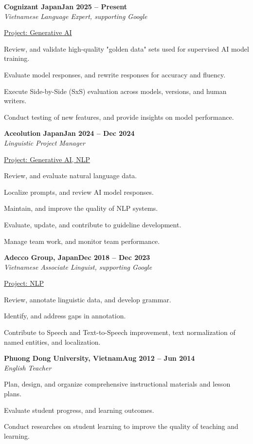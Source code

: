 \documentclass[letterpaper,10pt]{article}
\newcommand{\heading}[2]{
  \hspace{10pt}#1\hfill#2\\
}
\newcommand{\headingBf}[2]{
  \heading{\textbf{#1}}{\textbf{#2}}
}
\newcommand{\headingIt}[2]{
  \heading{\textit{#1}}{\textit{#2}}
}
\newenvironment{resume_list}{
  \vspace{-7pt}
  \begin{itemize}[itemsep=-2px, parsep=1pt, leftmargin=30pt]
}{
  \end{itemize}
}
\newcommand{\itemTitle}[1]{
  \item[] \underline{#1}\vspace{4pt}
}
\begin{document}
  \headingBf{Cognizant Japan}{Jan 2025 -- Present}
  \headingIt{Vietnamese Language Expert, supporting Google}{}
  \begin{resume_list}
  
  \itemTitle{Project: Generative AI}
    \item {Review, and validate high-quality "golden data" sets used for supervised AI model training.}
    \item {Evaluate model responses, and rewrite responses for accuracy and fluency.}
    \item {Execute Side-by-Side (SxS) evaluation across models, versions, and human writers.}
    \item {Conduct testing of new features, and provide insights on model performance.}
    
  \end{resume_list}
  
  \headingBf{Aceolution Japan}{Jan 2024 -- Dec 2024}
  \headingIt{Linguistic Project Manager}{}
  \begin{resume_list}

  \itemTitle{Project: Generative AI, NLP}
        \item {Review, and evaluate natural language data.}
        \item {Localize prompts, and review AI model responses.}
        \item {Maintain, and improve the quality of NLP systems.}
        \item {Evaluate, update, and contribute to guideline development.}
        \item {Manage team work, and monitor team performance.}
  \end{resume_list}

  \headingBf{Adecco Group, Japan}{Dec 2018 -- Dec 2023}
  \headingIt{Vietnamese Associate Linguist, supporting Google}{}
  \begin{resume_list}
   
    \itemTitle{Project: NLP}
    \item {Review, annotate linguistic data, and develop grammar.} 
        \item {Identify, and address gaps in annotation.}
        \item {Contribute to Speech and Text-to-Speech improvement, text normalization of named entities, and localization.}
  \end{resume_list}

  \headingBf{Phuong Dong University, Vietnam}{Aug 2012 -- Jun 2014}
  \headingIt{English Teacher}{}
  \begin{resume_list}
   
    \item {Plan, design, and organize comprehensive instructional materials and lesson plans.} 
        \item {Evaluate student progress, and learning outcomes.}
        \item {Conduct researches on student learning to improve the quality of teaching and learning.}
  \end{resume_list}
\end{document}
